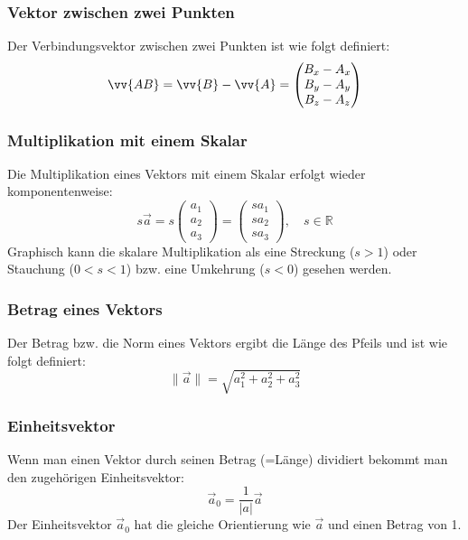 \subsubsection{Vektor zwischen zwei Punkten}
Der Verbindungsvektor zwischen zwei Punkten ist wie folgt definiert:
\begin{equation}
    \vv{AB} = \vv{B} - \vv{A} = 
    \begin{pmatrix} B_x-A_x \\ B_y-A_y \\ B_z-A_z \end{pmatrix}
\end{equation}

\subsubsection{Multiplikation mit einem Skalar}
Die Multiplikation eines Vektors mit einem Skalar erfolgt wieder komponentenweise:
\begin{equation}
s \vec{a} =
s
\begin{pmatrix} a_1 \\ a_2 \\ a_3 \end{pmatrix} =
\begin{pmatrix} s a_1 \\ s a_2 \\ s a_3 \end{pmatrix}, \quad s \in \mathbb{R}
\end{equation}
Graphisch kann die skalare Multiplikation als eine Streckung (\(s>1\)) oder Stauchung (\(0<s<1\)) bzw. eine Umkehrung (\(s<0\)) gesehen werden.
\subsubsection{Betrag eines Vektors}
Der Betrag bzw. die Norm eines Vektors ergibt die Länge des Pfeils und ist wie folgt definiert:
\begin{equation}
\|\vec{a}\| = \sqrt{a_1^2 + a_2^2 + a_3^2}
\end{equation}
\subsubsection{Einheitsvektor}
Wenn man einen Vektor durch seinen Betrag (=Länge) dividiert bekommt man den zugehörigen Einheitsvektor:
\begin{equation}
    \vec{a}_0 = \frac{1}{|a|}\vec{a}
\end{equation}
Der Einheitsvektor \(\vec{a}_0\) hat die gleiche Orientierung wie \(\vec{a}\) und einen Betrag von 1.
